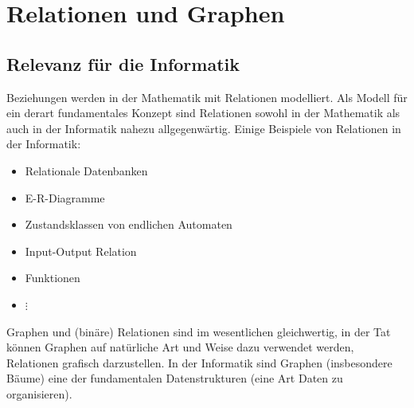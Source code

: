 
\chapter{Relationen und Graphen}



%
%
%

\section*{Relevanz für die Informatik}
Beziehungen werden in der Mathematik mit Relationen modelliert. Als Modell für ein derart fundamentales Konzept sind Relationen sowohl in der Mathematik als auch in der Informatik nahezu allgegenwärtig. Einige Beispiele von Relationen in der Informatik:
\begin{itemize}
\item Relationale Datenbanken
\item E-R-Diagramme
\item Zustandsklassen von endlichen Automaten
\item Input-Output Relation
\item Funktionen
\item $\vdots$
\end{itemize}
Graphen und (binäre) Relationen sind im wesentlichen gleichwertig, in der Tat können
Graphen auf natürliche Art und Weise dazu verwendet werden, Relationen grafisch
darzustellen. In der Informatik sind Graphen (insbesondere Bäume) eine der
fundamentalen Datenstrukturen (eine Art Daten zu organisieren).


